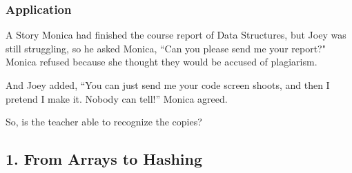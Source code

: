 \documentclass[aspectratio=169, 14pt]{beamer}
\begin{document}
\begin{frame}
	\frametitle{Application}
	\begin{exampleblock}{A Story}
		Monica had finished the course report of Data Structures, but Joey was still struggling, so he asked Monica, ``Can you please send me your report?" Monica refused because she thought they would be accused of plagiarism.

		And Joey added, ``You can just send me your code screen shoots, and then I pretend I make it. Nobody can tell!'' Monica agreed.
	\end{exampleblock}

	\alert{So, is the teacher able to recognize the copies?}
\end{frame}
{
\begin{frame}
	\section{\textcolor{darkmidnightblue}{1. From Arrays to Hashing}}
\end{frame}

}
\end{document}
